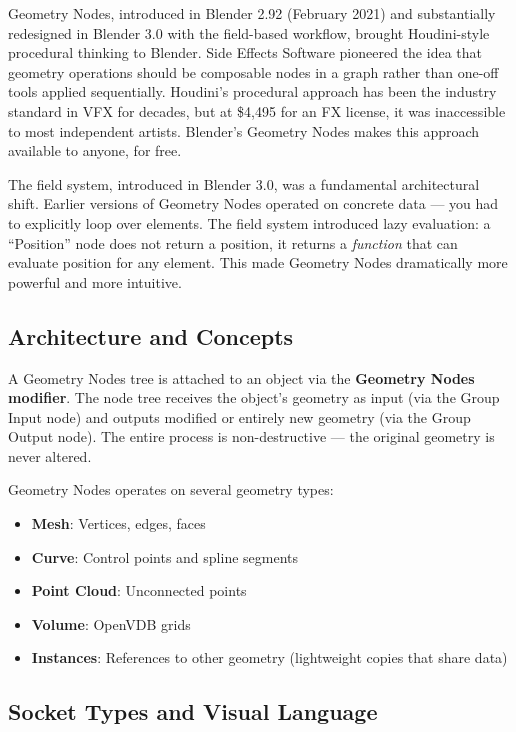 \begin{historynote}
Geometry Nodes, introduced in Blender 2.92 (February 2021) and substantially redesigned in Blender 3.0 with the field-based workflow, brought Houdini-style procedural thinking to Blender. Side Effects Software pioneered the idea that geometry operations should be composable nodes in a graph rather than one-off tools applied sequentially. Houdini's procedural approach has been the industry standard in VFX for decades, but at \$4,495 for an FX license, it was inaccessible to most independent artists. Blender's Geometry Nodes makes this approach available to anyone, for free.

The field system, introduced in Blender 3.0, was a fundamental architectural shift. Earlier versions of Geometry Nodes operated on concrete data --- you had to explicitly loop over elements. The field system introduced lazy evaluation: a ``Position'' node does not return a position, it returns a \textit{function} that can evaluate position for any element. This made Geometry Nodes dramatically more powerful and more intuitive.
\end{historynote}

\subsection{Architecture and Concepts}
\label{sec:gnarch}

A Geometry Nodes tree is attached to an object via the \textbf{Geometry Nodes modifier}. The node tree receives the object's geometry as input (via the Group Input node) and outputs modified or entirely new geometry (via the Group Output node). The entire process is non-destructive --- the original geometry is never altered.

Geometry Nodes operates on several geometry types:
\begin{itemize}[leftmargin=2em]
  \item \textbf{Mesh}: Vertices, edges, faces
  \item \textbf{Curve}: Control points and spline segments
  \item \textbf{Point Cloud}: Unconnected points
  \item \textbf{Volume}: OpenVDB grids
  \item \textbf{Instances}: References to other geometry (lightweight copies that share data)
\end{itemize}

\subsection{Socket Types and Visual Language}
\label{sec:gnsockets}

